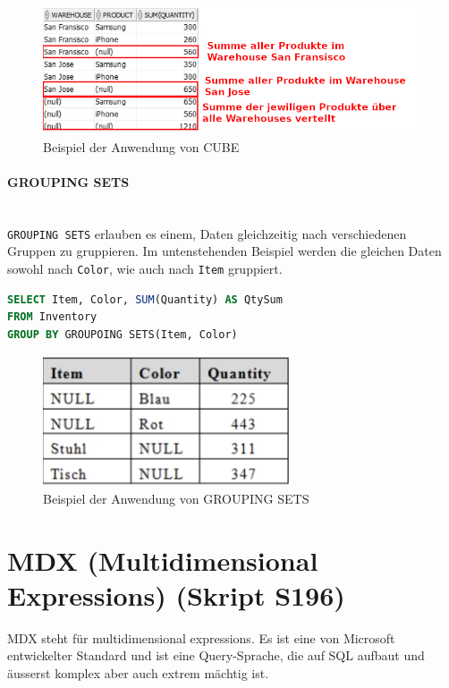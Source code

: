 \documentclass[a4paper, 11pt, nofootinbib]{article}
\newcommand{\code}[1]{\texttt{#1}}
\begin{document}
\begin{figure}[htb]
	\centering
	\includegraphics[keepaspectratio=true,height=7\baselineskip]{cube.jpg}
	\caption{Beispiel der Anwendung von CUBE}
	\label{fig:cube}
\end{figure}

\paragraph{GROUPING SETS}\mbox{}\\
\code{GROUPING SETS} erlauben es einem, Daten gleichzeitig nach verschiedenen Gruppen zu gruppieren. Im untenstehenden Beispiel werden die gleichen Daten sowohl nach \code{Color}, wie auch nach \code{Item} gruppiert.

\begin{lstlisting}[language=SQL, captionpos=b, caption={Beispiel der Nutzung von GROUPING SETS}]
SELECT Item, Color, SUM(Quantity) AS QtySum
FROM Inventory
GROUP BY GROUPOING SETS(Item, Color)
\end{lstlisting}

\begin{figure}[htb]
	\centering
	\includegraphics[keepaspectratio=true,height=7\baselineskip]{grouping_sets.jpg}
	\caption{Beispiel der Anwendung von GROUPING SETS}
	\label{fig:group_sets}
\end{figure}

\section{MDX (Multidimensional Expressions) (Skript S196)}
MDX steht für multidimensional expressions. Es ist eine von Microsoft entwickelter Standard und ist eine Query-Sprache, die auf SQL aufbaut und äusserst komplex aber auch extrem mächtig ist.
\end{document}
